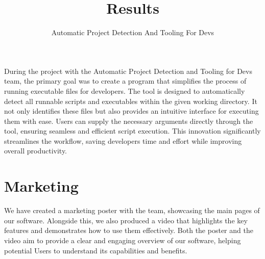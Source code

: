 \documentclass{article}
\title{Results}
\author{Automatic Project Detection And Tooling For Devs}
\date{}
\begin{document}
\maketitle

\clearpage

During the project with the Automatic Project Detection and Tooling for Devs team, the primary goal was to create a program that simplifies the process of running executable files for developers. The tool is designed to automatically detect all runnable scripts and executables within the given working directory. It not only identifies these files but also provides an intuitive interface for executing them with ease. Users can supply the necessary arguments directly through the tool, ensuring seamless and efficient script execution. This innovation significantly streamlines the workflow, saving developers time and effort while improving overall productivity.

\section{Marketing}

We have created a marketing poster with the team, showcasing the main pages of our software. Alongside this, we also produced a video that highlights the key features and demonstrates how to use them effectively. Both the poster and the video aim to provide a clear and engaging overview of our software, helping potential Users to understand its capabilities and benefits.
\end{document}
